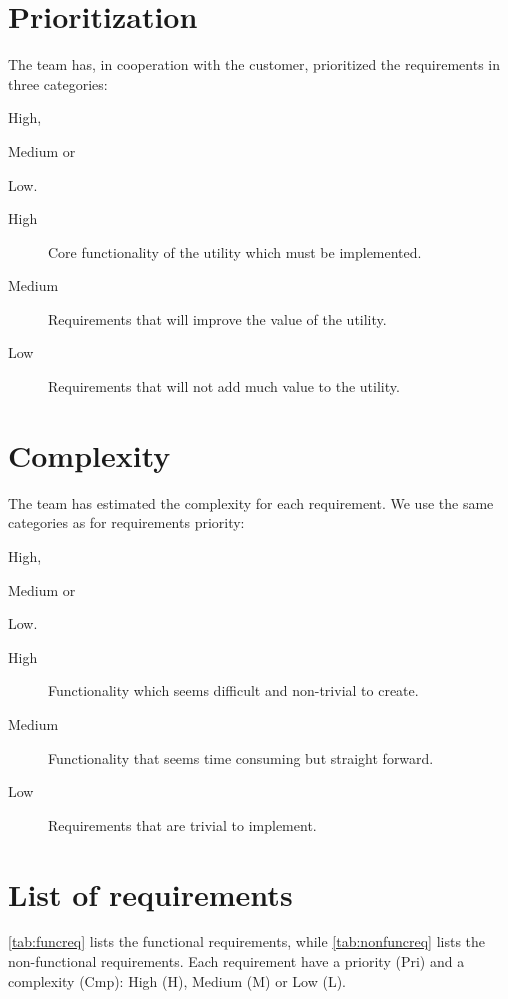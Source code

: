 \section{Prioritization}
\label{sec:reqspriority}
The team has, in cooperation with the customer, prioritized the requirements
in three categories:
\begin{inparaenum}
	\item High,
	\item Medium or
	\item Low.
\end{inparaenum} 

\begin{description}
	\item[High] Core functionality of the utility which must be implemented.
	\item[Medium] Requirements that will improve the value of the utility.
	\item[Low] Requirements that will not add much value to the utility.
\end{description}

\section{Complexity}
\label{sec:reqscompl}
The team has estimated the complexity for each requirement. We use the same
categories as for requirements priority:
\begin{inparaenum}
	\item High,
	\item Medium or
	\item Low.
\end{inparaenum} 

\begin{description}
	\item[High] Functionality which seems difficult and non-trivial to create.
	\item[Medium] Functionality that seems time consuming but straight forward.
	\item[Low] Requirements that are trivial to implement.
\end{description}

\section{List of requirements}
\label{sec:reqslist}
\autoref{tab:funcreq} lists the functional requirements, while
\autoref{tab:nonfuncreq} lists the non-functional requirements. Each
requirement have a priority (Pri) and a complexity (Cmp): High (H), 
Medium (M) or Low (L).

